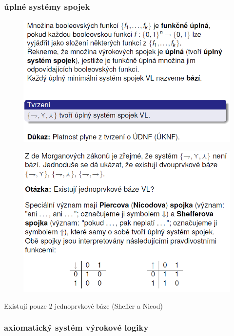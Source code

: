\documentclass[10pt,a4paper]{article}
\theoremstyle{note}
\begin{document}
		\subsubsection{úplné systémy spojek}

			\begin{figure}[H]
			\centering
			\includegraphics[width=13cm]{img/uplneSystemySpojek.png}
			\end{figure}

			\begin{figure}[H]
			\centering
			\includegraphics[width=13cm]{img/uplneSystemySpojek2.png}
			\end{figure}

			Existují pouze 2 jednoprvkové báze (Sheffer a Nicod)

		\subsubsection{axiomatický systém výrokové logiky}
\end{document}
